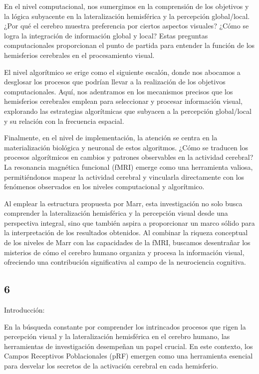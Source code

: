 \documentclass[12pt,oneside]{uhthesis}
\begin{document}
En el nivel computacional, nos sumergimos en la comprensión de los objetivos y la lógica subyacente en la lateralización hemisférica y la percepción global/local. ¿Por qué el cerebro muestra preferencia por ciertos aspectos visuales? ¿Cómo se logra la integración de información global y local? Estas preguntas computacionales proporcionan el punto de partida para entender la función de los hemisferios cerebrales en el procesamiento visual.

El nivel algorítmico se erige como el siguiente escalón, donde nos abocamos a desglosar los procesos que podrían llevar a la realización de los objetivos computacionales. Aquí, nos adentramos en los mecanismos precisos que los hemisferios cerebrales emplean para seleccionar y procesar información visual, explorando las estrategias algorítmicas que subyacen a la percepción global/local y su relación con la frecuencia espacial.

Finalmente, en el nivel de implementación, la atención se centra en la materialización biológica y neuronal de estos algoritmos. ¿Cómo se traducen los procesos algorítmicos en cambios y patrones observables en la actividad cerebral? La resonancia magnética funcional (fMRI) emerge como una herramienta valiosa, permitiéndonos mapear la actividad cerebral y vincularla directamente con los fenómenos observados en los niveles computacional y algorítmico.

Al emplear la estructura propuesta por Marr, esta investigación no solo busca comprender la lateralización hemisférica y la percepción visual desde una perspectiva integral, sino que también aspira a proporcionar un marco sólido para la interpretación de los resultados obtenidos. Al combinar la riqueza conceptual de los niveles de Marr con las capacidades de la fMRI, buscamos desentrañar los misterios de cómo el cerebro humano organiza y procesa la información visual, ofreciendo una contribución significativa al campo de la neurociencia cognitiva.

\subsection{6}

Introducción:

En la búsqueda constante por comprender los intrincados procesos que rigen la percepción visual y la lateralización hemisférica en el cerebro humano, las herramientas de investigación desempeñan un papel crucial. En este contexto, los Campos Receptivos Poblacionales (pRF) emergen como una herramienta esencial para desvelar los secretos de la activación cerebral en cada hemisferio.
\end{document}
